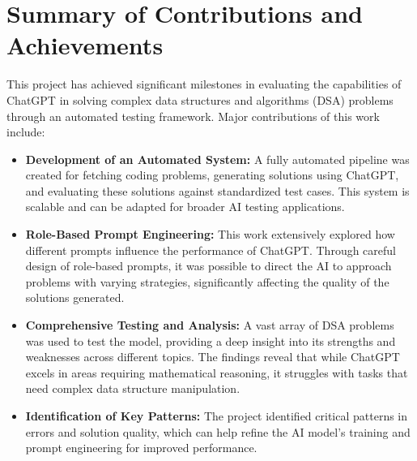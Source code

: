 


\section{Summary of Contributions and Achievements}
\label{sec:intro_sum_results}
This project has achieved significant milestones in evaluating the capabilities of ChatGPT in solving complex data structures and algorithms (DSA) problems through an automated testing framework. Major contributions of this work include:

\begin{itemize}
    \item \textbf{Development of an Automated System:} A fully automated pipeline was created for fetching coding problems, generating solutions using ChatGPT, and evaluating these solutions against standardized test cases. This system is scalable and can be adapted for broader AI testing applications.
    \item \textbf{Role-Based Prompt Engineering:} This work extensively explored how different prompts influence the performance of ChatGPT. Through careful design of role-based prompts, it was possible to direct the AI to approach problems with varying strategies, significantly affecting the quality of the solutions generated.
    \item \textbf{Comprehensive Testing and Analysis:} A vast array of DSA problems was used to test the model, providing a deep insight into its strengths and weaknesses across different topics. The findings reveal that while ChatGPT excels in areas requiring mathematical reasoning, it struggles with tasks that need complex data structure manipulation.
    \item \textbf{Identification of Key Patterns:} The project identified critical patterns in errors and solution quality, which can help refine the AI model's training and prompt engineering for improved performance.
\end{itemize}


